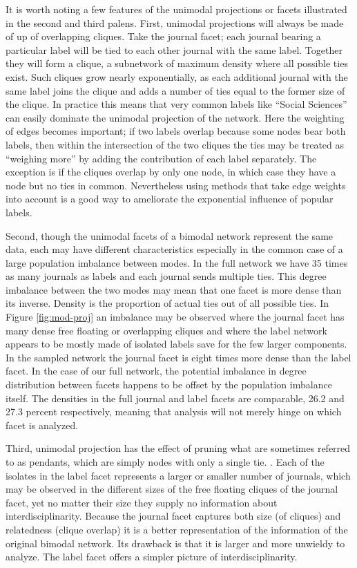 \documentclass[]{book}
\theoremstyle{definition}
\theoremstyle{definition}
\theoremstyle{definition}
\theoremstyle{remark}
\begin{document}
It is worth noting a few features of the unimodal projections or facets
illustrated in the second and third palens. First, unimodal projections
will always be made of up of overlapping cliques. Take the journal
facet; each journal bearing a particular label will be tied to each
other journal with the same label. Together they will form a clique, a
subnetwork of maximum density where all possible ties exist. Such
cliques grow nearly exponentially, as each additional journal with the
same label joins the clique and adds a number of ties equal to the
former size of the clique. In practice this means that very common
labels like ``Social Sciences'' can easily dominate the unimodal
projection of the network. Here the weighting of edges becomes
important; if two labels overlap because some nodes bear both labels,
then within the intersection of the two cliques the ties may be treated
as ``weighing more'' by adding the contribution of each label
separately. The exception is if the cliques overlap by only one node, in
which case they have a node but no ties in common. Nevertheless using
methods that take edge weights into account is a good way to ameliorate
the exponential influence of popular labels.

Second, though the unimodal facets of a bimodal network represent the
same data, each may have different characteristics especially in the
common case of a large population imbalance between modes. In the full
network we have 35 times as many journals as labels and each journal
sends multiple ties. This degree imbalance between the two modes may
mean that one facet is more dense than its inverse. Density is the
proportion of actual ties out of all possible ties. In Figure
\ref{fig:mod-proj} an imbalance may be observed where the journal facet
has many dense free floating or overlapping cliques and where the label
network appears to be mostly made of isolated labels save for the few
larger components. In the sampled network the journal facet is eight
times more dense than the label facet. In the case of our full network,
the potential imbalance in degree distribution between facets happens to
be offset by the population imbalance itself. The densities in the full
journal and label facets are comparable, 26.2 and 27.3 percent
respectively, meaning that analysis will not merely hinge on which facet
is analyzed.

Third, unimodal projection has the effect of pruning what are sometimes
referred to as pendants, which are simply nodes with only a single tie.
. Each of the isolates in the label facet represents a larger or smaller
number of journals, which may be observed in the different sizes of the
free floating cliques of the journal facet, yet no matter their size
they supply no information about interdisciplinarity. Because the
journal facet captures both size (of cliques) and relatedness (clique
overlap) it is a better representation of the information of the
original bimodal network. Its drawback is that it is larger and more
unwieldy to analyze. The label facet offers a simpler picture of
interdisciplinarity.
\end{document}
